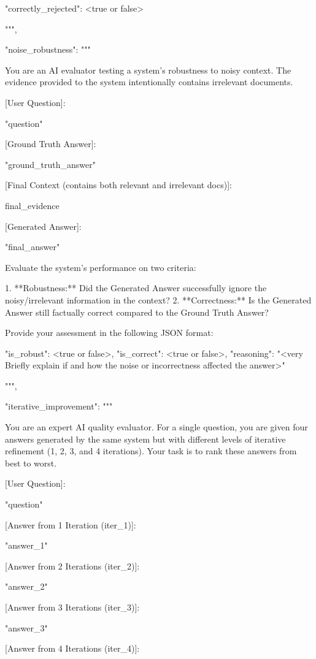 \documentclass[11pt]{article}
\begin{document}
\begin{PromptBlock}
{  {{
    "correctly_rejected": <true or false>
  }}

  """,

  "noise_robustness": """

  You are an AI evaluator testing a system's robustness to noisy context. The evidence provided to the system intentionally contains irrelevant documents.

  [User Question]:

  "{question}"

  [Ground Truth Answer]:

  "{ground_truth_answer}"

  [Final Context (contains both relevant and irrelevant docs)]:

  {final_evidence}

  [Generated Answer]:

  "{final_answer}"

  Evaluate the system's performance on two criteria:

  1.  **Robustness:** Did the Generated Answer successfully ignore the noisy/irrelevant information in the context?
  2.  **Correctness:** Is the Generated Answer still factually correct compared to the Ground Truth Answer?

  Provide your assessment in the following JSON format:

  {{
    "is_robust": <true or false>,
    "is_correct": <true or false>,
    "reasoning": "<very Briefly explain if and how the noise or incorrectness affected the answer>"
  }}

  """,

  "iterative_improvement": """

  You are an expert AI quality evaluator. For a single question, you are given four answers generated by the same system but with different levels of iterative refinement (1, 2, 3, and 4 iterations). Your task is to rank these answers from best to worst.

  [User Question]:

  "{question}"

  [Answer from 1 Iteration (iter_1)]:

  "{answer_1}"

  [Answer from 2 Iterations (iter_2)]:

  "{answer_2}"

  [Answer from 3 Iterations (iter_3)]:

  "{answer_3}"

  [Answer from 4 Iterations (iter_4)]:

}
\end{PromptBlock}
\end{document}
